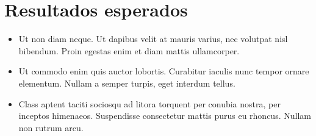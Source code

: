 \section{Resultados esperados}
\begin{itemize}
\item Ut non diam neque. Ut dapibus velit at mauris varius, nec volutpat nisl bibendum. Proin egestas enim et diam mattis ullamcorper.
%
\item Ut commodo enim quis auctor lobortis. Curabitur iaculis nunc tempor ornare elementum. Nullam a semper turpis, eget interdum tellus.
%
\item Class aptent taciti sociosqu ad litora torquent per conubia nostra, per inceptos himenaeos. Suspendisse consectetur mattis purus eu rhoncus. Nullam non rutrum arcu.
\end{itemize}